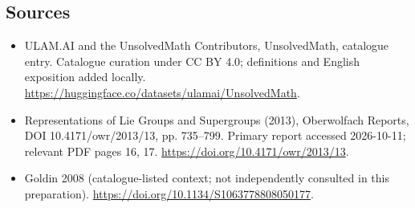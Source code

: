 \documentclass[11pt]{article}
\begin{document}
\subsection{Sources}
\begin{itemize}
\item[\hypertarget{source:statement:1}{S1}] ULAM.AI and the UnsolvedMath Contributors, UnsolvedMath, catalogue entry. Catalogue curation under CC BY 4.0; definitions and English exposition added locally.
\url{https://huggingface.co/datasets/ulamai/UnsolvedMath}.
\item[\hypertarget{source:statement:2}{S2}] Representations of Lie Groups and Supergroups (2013), Oberwolfach Reports, DOI 10.4171/owr/2013/13, pp. 735--799. Primary report accessed 2026-10-11; relevant PDF pages 16, 17.
\url{https://doi.org/10.4171/owr/2013/13}.
\item[\hypertarget{source:statement:3}{S3}] Goldin 2008 (catalogue-listed context; not independently consulted in this preparation).
\url{https://doi.org/10.1134/S1063778808050177}.
\end{itemize}
\label{end:statement}
\end{document}
